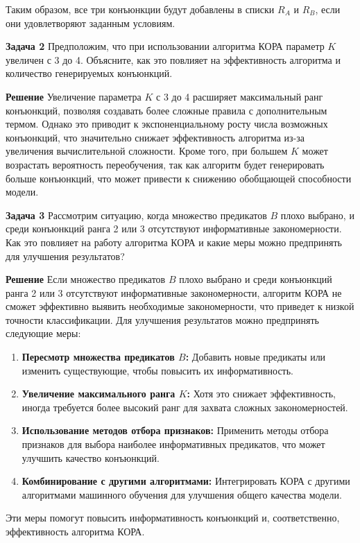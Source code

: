 Таким образом, все три конъюнкции будут добавлены в списки \( R_A \) и \( R_B \), если они удовлетворяют заданным условиям.

\textbf{Задача 2}  
Предположим, что при использовании алгоритма КОРА параметр \( K \) увеличен с 3 до 4. Объясните, как это повлияет на эффективность алгоритма и количество генерируемых конъюнкций.

\textbf{Решение}  
Увеличение параметра \( K \) с 3 до 4 расширяет максимальный ранг конъюнкций, позволяя создавать более сложные правила с дополнительным термом. Однако это приводит к экспоненциальному росту числа возможных конъюнкций, что значительно снижает эффективность алгоритма из-за увеличения вычислительной сложности. Кроме того, при большем \( K \) может возрастать вероятность переобучения, так как алгоритм будет генерировать больше конъюнкций, что может привести к снижению обобщающей способности модели.

\textbf{Задача 3}  
Рассмотрим ситуацию, когда множество предикатов \( B \) плохо выбрано, и среди конъюнкций ранга 2 или 3 отсутствуют информативные закономерности. Как это повлияет на работу алгоритма КОРА и какие меры можно предпринять для улучшения результатов?

\textbf{Решение}  
Если множество предикатов \( B \) плохо выбрано и среди конъюнкций ранга 2 или 3 отсутствуют информативные закономерности, алгоритм КОРА не сможет эффективно выявить необходимые закономерности, что приведет к низкой точности классификации. Для улучшения результатов можно предпринять следующие меры:

\begin{enumerate}
    \item \textbf{Пересмотр множества предикатов \( B \):} Добавить новые предикаты или изменить существующие, чтобы повысить их информативность.
    \item \textbf{Увеличение максимального ранга \( K \):} Хотя это снижает эффективность, иногда требуется более высокий ранг для захвата сложных закономерностей.
    \item \textbf{Использование методов отбора признаков:} Применить методы отбора признаков для выбора наиболее информативных предикатов, что может улучшить качество конъюнкций.
    \item \textbf{Комбинирование с другими алгоритмами:} Интегрировать КОРА с другими алгоритмами машинного обучения для улучшения общего качества модели.
\end{enumerate}

Эти меры помогут повысить информативность конъюнкций и, соответственно, эффективность алгоритма КОРА.

